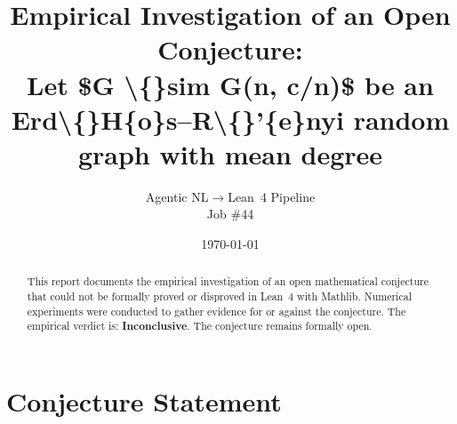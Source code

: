 \documentclass[11pt]{article}
\title{Empirical Investigation of an Open Conjecture:\\
Let \$G \textbackslash\{\}sim G(n, c/n)\$ be an Erd\textbackslash\{\}H\{o\}s--R\textbackslash\{\}'\{e\}nyi random graph with mean degree }
\author{Agentic NL$\to$Lean~4 Pipeline \\ \small Job \#44}
\date{\today}
\begin{document}
\maketitle

\begin{abstract}
This report documents the empirical investigation of an open mathematical conjecture
that could not be formally proved or disproved in Lean~4 with Mathlib.
Numerical experiments were conducted to gather evidence for or against the conjecture.
The empirical verdict is: \textbf{\textcolor{orange!80!black}{Inconclusive}}.
The conjecture remains formally open.
\end{abstract}

\section{Conjecture Statement}
\end{document}
